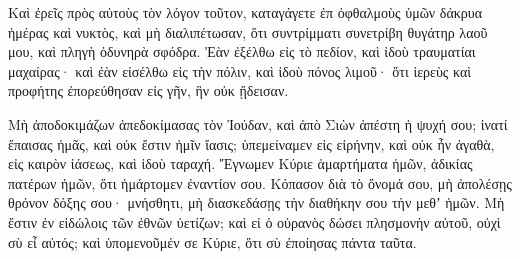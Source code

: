 {\par }{\PP {}Καὶ ἐρεῖς πρὸς αὐτοὺς τὸν λόγον τοῦτον, καταγάγετε ἐπ ὀφθαλμοὺς ὑμῶν δάκρυα ἡμέρας καὶ νυκτὸς, καὶ μὴ διαλιπέτωσαν, ὅτι συντρίμματι συνετρίβη θυγάτηρ λαοῦ μου, καὶ πληγὴ ὀδυνηρὰ σφόδρα.
Ἐὰν ἐξέλθω εἰς τὸ πεδίον, καὶ ἰδοὺ τραυματίαι μαχαίρας· καὶ ἐὰν εἰσέλθω εἰς τὴν πόλιν, καὶ ἰδοὺ πόνος λιμοῦ· ὅτι ἱερεὺς καὶ προφήτης ἐπορεύθησαν εἰς γῆν, ἣν οὐκ ᾔδεισαν.
\par }{\PP {}Μὴ ἀποδοκιμάζων ἀπεδοκίμασας τὸν Ἰούδαν, καὶ ἀπὸ Σιὼν ἀπέστη ἡ ψυχή σου; ἱνατί ἔπαισας ἡμᾶς, καὶ οὐκ ἔστιν ἡμῖν ἴασις; ὑπεμείναμεν εἰς εἰρήνην, καὶ οὐκ ἦν ἀγαθὰ, εἰς καιρὸν ἰάσεως, καὶ ἰδοὺ ταραχή.
Ἔγνωμεν Κύριε ἁμαρτήματα ἡμῶν, ἀδικίας πατέρων ἡμῶν, ὅτι ἡμάρτομεν ἐναντίον σου.
Κόπασον διὰ τὸ ὄνομά σου, μὴ ἀπολέσῃς θρόνον δόξης σου· μνήσθητι, μὴ διασκεδάσῃς τὴν διαθήκην σου τὴν μεθʼ ἡμῶν.
Μὴ ἔστιν ἐν εἰδώλοις τῶν ἐθνῶν ὑετίζων; καὶ εἰ ὁ οὐρανὸς δώσει πλησμονὴν αὐτοῦ, οὐχὶ σὺ εἶ αὐτός; καὶ ὑπομενοῦμέν σε Κύριε, ὅτι σὺ ἐποίησας πάντα ταῦτα.

}

